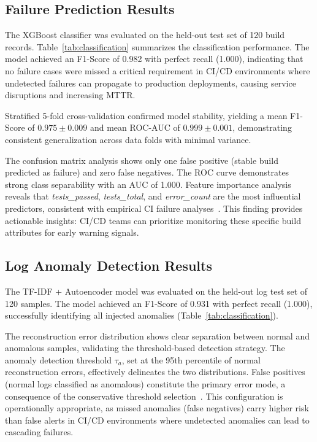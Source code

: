 \documentclass[sn-nature]{sn-jnl}
\theoremstyle{thmstyleone}
\theoremstyle{thmstyletwo}
\theoremstyle{thmstylethree}
\begin{document}
\subsection{Failure Prediction Results}\label{subsec:failureresults}

The XGBoost classifier was evaluated on the held-out test set of 120 build records. Table~\ref{tab:classification} summarizes the classification performance. The model achieved an F1-Score of 0.982 with perfect recall (1.000), indicating that no failure cases were missed a critical requirement in CI/CD environments where undetected failures can propagate to production deployments, causing service disruptions and increasing MTTR.

Stratified 5-fold cross-validation confirmed model stability, yielding a mean F1-Score of $0.975 \pm 0.009$ and mean ROC-AUC of $0.999 \pm 0.001$, demonstrating consistent generalization across data folds with minimal variance.

The confusion matrix analysis shows only one false positive (stable build predicted as failure) and zero false negatives. The ROC curve demonstrates strong class separability with an AUC of 1.000. Feature importance analysis reveals that \textit{tests\_passed}, \textit{tests\_total}, and \textit{error\_count} are the most influential predictors, consistent with empirical CI failure analyses~\cite{rausch2017empirical}. This finding provides actionable insights: CI/CD teams can prioritize monitoring these specific build attributes for early warning signals.

\subsection{Log Anomaly Detection Results}\label{subsec:anomalyresults}

The TF-IDF + Autoencoder model was evaluated on the held-out log test set of 120 samples. The model achieved an F1-Score of 0.931 with perfect recall (1.000), successfully identifying all injected anomalies (Table~\ref{tab:classification}).

The reconstruction error distribution shows clear separation between normal and anomalous samples, validating the threshold-based detection strategy. The anomaly detection threshold $\tau_a$, set at the 95th percentile of normal reconstruction errors, effectively delineates the two distributions. False positives (normal logs classified as anomalous) constitute the primary error mode, a consequence of the conservative threshold selection~\cite{sakurada2014anomaly}. This configuration is operationally appropriate, as missed anomalies (false negatives) carry higher risk than false alerts in CI/CD environments where undetected anomalies can lead to cascading failures.
\end{document}
